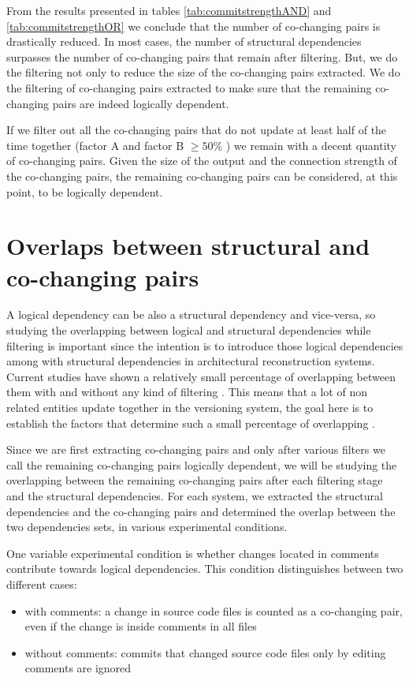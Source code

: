 \documentclass[12pt, a4paper, twoside]{report}
\begin{document}
From the results presented in tables \ref{tab:commitstrengthAND} and \ref{tab:commitstrengthOR} we conclude that the number of co-changing pairs is drastically reduced. In most cases, the number of structural dependencies surpasses the number of co-changing pairs that remain after filtering. But, we do the filtering not only to reduce the size of the co-changing pairs extracted. We do the filtering of co-changing pairs extracted to make sure that the remaining co-changing pairs are indeed logically dependent.

If we filter out all the co-changing pairs that do not update at least half of the time together (factor A and factor B $\geq 50 \%$ ) we remain with a decent quantity of co-changing pairs. Given the size of the output and the connection strength of the co-changing pairs, the remaining co-changing pairs can be considered, at this point, to be logically dependent. 




\section{Overlaps between structural and co-changing pairs}
\label{sec:overlaps}

A logical dependency can be also a structural dependency and vice-versa, so studying the overlapping between logical and structural dependencies while filtering is important since the intention is to introduce those logical dependencies among with structural dependencies in architectural reconstruction systems. Current studies have shown a relatively small percentage of overlapping between them with and without any kind of filtering \cite{DBLP:journals/jss/AjienkaC17}. This means that a lot of non related entities update together in the versioning system, the goal here is to establish the factors that determine such a small percentage of overlapping \cite{enase19}.

Since we are first extracting co-changing pairs and only after various filters we call the remaining co-changing pairs logically dependent, we will be studying the overlapping between the remaining co-changing pairs after each filtering stage and the structural dependencies. 
For each system, we extracted the structural dependencies and the co-changing pairs and determined the overlap between the two dependencies sets, in various experimental conditions. 

One variable experimental condition is whether changes located in comments contribute towards logical dependencies. This condition distinguishes between two different cases: 
\begin{itemize}
	\item with comments: a change in source code files is counted as a co-changing pair, even if the change is inside comments in all files
	\item without comments: commits that changed source code files only by editing comments are ignored
\end{itemize}
\end{document}
